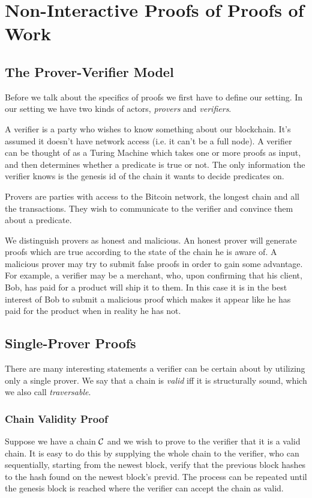 \section{Non-Interactive Proofs of Proofs of Work}


\subsection{The Prover-Verifier Model}
Before we talk about the specifics of proofs we first have to define our setting. In our setting we have two kinds of actors, \emph{provers} and \emph{verifiers}.

A verifier is a party who wishes to know something about our blockchain. It's assumed it doesn't have network access (i.e. it can't be a full node). A verifier can be thought of as a Turing Machine which takes one or more proofs as input, and then determines whether a predicate is true or not. The only information the verifier knows is the genesis id of the chain it wants to decide predicates on.

Provers are parties with access to the Bitcoin network, the longest chain and all the transactions. They wish to communicate to the verifier and convince them about a predicate.

We distinguish provers as honest and malicious. An honest prover will generate proofs which are true according to the state of the chain he is aware of. A malicious prover may try to submit false proofs in order to gain some advantage. For example, a verifier may be a merchant, who, upon confirming that his client, Bob, has paid for a product will ship it to them. In this case it is in the best interest of Bob to submit a malicious proof which makes it appear like he has paid for the product when in reality he has not.

\subsection{Single-Prover Proofs}
There are many interesting statements a verifier can be certain about by utilizing only a single prover. We say that a chain is \textit{valid} iff it is structurally sound, which we also call \textit{traversable}.

\subsubsection{Chain Validity Proof}
Suppose we have a chain $\mathcal{C}$ and we wish to prove to the verifier that it is a valid chain. It is easy to do this by supplying the whole chain to the verifier, who can sequentially, starting from the newest block, verify that the previous block hashes to the hash found on the newest block's \textsf{previd}. The process can be repeated until the genesis block is reached where the verifier can accept the chain as valid.


